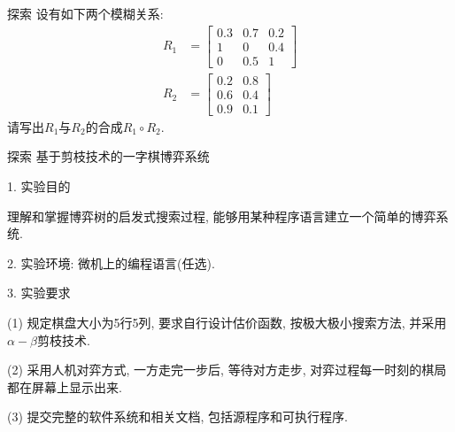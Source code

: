 \begin{custom}[explorecolor]{探索}
设有如下两个模糊关系:
\begin{align*}
R_{1}&=\left[
\begin{array}{ccc}{0.3} & {0.7} & {0.2} \\ {1} & {0} & {0.4} \\ {0} & {0.5} & {1}\end{array}\right]\\
R_{2}&=\left[\begin{array}{cc}{0.2} & {0.8} \\ {0.6} & {0.4} \\ {0.9} & {0.1}\end{array}\right]
\end{align*}请写出$R_1$与$R_2$的合成$R_1\circ R_2$.
\end{custom}
\begin{custom}[explorecolor]{探索}
基于剪枝技术的一字棋博弈系统

    1. 实验目的

    理解和掌握博弈树的启发式搜索过程, 能够用某种程序语言建立一个简单的博弈系统.

    2. 实验环境: 微机上的编程语言(任选).

    3. 实验要求

    (1) 规定棋盘大小为5行5列, 要求自行设计估价函数, 按极大极小搜索方法, 并采用$\alpha-\beta$剪枝技术.

    (2) 采用人机对弈方式, 一方走完一步后, 等待对方走步, 对弈过程每一时刻的棋局都在屏幕上显示出来.

    (3) 提交完整的软件系统和相关文档, 包括源程序和可执行程序.
\end{custom}

